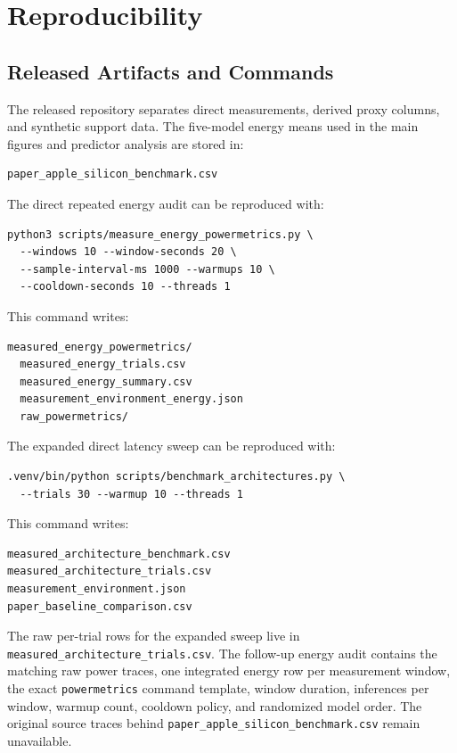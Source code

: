 \documentclass[conference]{IEEEtran}
\begin{document}
\appendices
\section{Reproducibility}
\label{sec:appendix}

\subsection{Released Artifacts and Commands}
The released repository separates direct measurements, derived proxy columns,
and synthetic support data. The five-model energy means used in the main
figures and predictor analysis are stored in:
\begin{verbatim}
paper_apple_silicon_benchmark.csv
\end{verbatim}
The direct repeated energy audit can be reproduced with:
\begin{verbatim}
python3 scripts/measure_energy_powermetrics.py \
  --windows 10 --window-seconds 20 \
  --sample-interval-ms 1000 --warmups 10 \
  --cooldown-seconds 10 --threads 1
\end{verbatim}
This command writes:
\begin{verbatim}
measured_energy_powermetrics/
  measured_energy_trials.csv
  measured_energy_summary.csv
  measurement_environment_energy.json
  raw_powermetrics/
\end{verbatim}
The expanded direct latency sweep can be reproduced with:
\begin{verbatim}
.venv/bin/python scripts/benchmark_architectures.py \
  --trials 30 --warmup 10 --threads 1
\end{verbatim}
This command writes:
\begin{verbatim}
measured_architecture_benchmark.csv
measured_architecture_trials.csv
measurement_environment.json
paper_baseline_comparison.csv
\end{verbatim}
The raw per-trial rows for the expanded sweep live in
\texttt{measured\_architecture\_trials.csv}. The follow-up energy audit
contains the matching raw power traces, one integrated energy row per
measurement window, the exact \texttt{powermetrics} command template, window
duration, inferences per window, warmup count, cooldown policy, and randomized
model order. The original source traces behind
\texttt{paper\_apple\_silicon\_benchmark.csv} remain unavailable.
\end{document}
